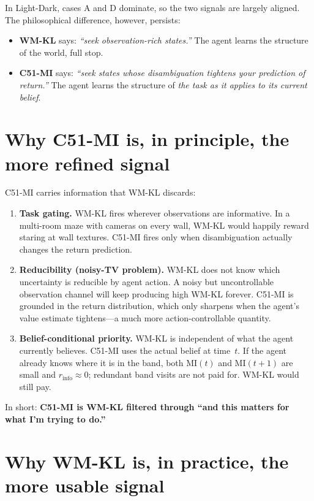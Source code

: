 \documentclass[11pt]{article}
\begin{document}
In Light-Dark, cases A and D dominate, so the two signals are largely
aligned. The philosophical difference, however, persists:

\begin{itemize}
  \item \textbf{WM-KL} says: \emph{``seek observation-rich states.''} The
    agent learns the structure of the world, full stop.
  \item \textbf{C51-MI} says: \emph{``seek states whose disambiguation
    tightens your prediction of return.''} The agent learns the structure
    of \emph{the task as it applies to its current belief}.
\end{itemize}

\section{Why C51-MI is, in principle, the more refined signal}

C51-MI carries information that WM-KL discards:

\begin{enumerate}
  \item \textbf{Task gating.} WM-KL fires wherever observations are
    informative. In a multi-room maze with cameras on every wall, WM-KL
    would happily reward staring at wall textures. C51-MI fires only when
    disambiguation actually changes the return prediction.
  \item \textbf{Reducibility (noisy-TV problem).} WM-KL does not know which
    uncertainty is reducible by agent action. A noisy but uncontrollable
    observation channel will keep producing high WM-KL forever. C51-MI is
    grounded in the return distribution, which only sharpens when the
    agent's value estimate tightens---a much more action-controllable
    quantity.
  \item \textbf{Belief-conditional priority.} WM-KL is independent of what
    the agent currently believes. C51-MI uses the actual belief at time~$t$.
    If the agent already knows where it is in the band, both $\mathrm{MI}(t)$
    and $\mathrm{MI}(t{+}1)$ are small and $r_{\mathrm{info}} \approx 0$;
    redundant band visits are not paid for. WM-KL would still pay.
\end{enumerate}

\noindent
In short: \textbf{C51-MI is WM-KL filtered through ``and this matters for
what I'm trying to do.''}

\section{Why WM-KL is, in practice, the more usable signal}
\end{document}
